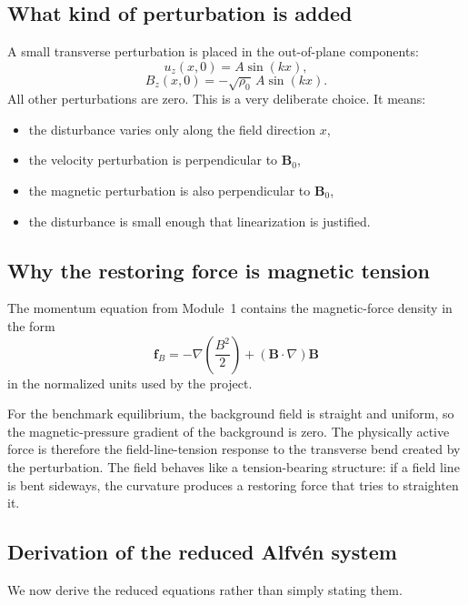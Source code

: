\documentclass[11pt]{article}
\newcommand{\Bvec}{\mathbf{B}}
\begin{document}
\subsection{What kind of perturbation is added}
A small transverse perturbation is placed in the out-of-plane components:
\begin{equation}
u_z(x,0) = A\sin(kx),
\label{eq:m2-uz-init}
\end{equation}
\begin{equation}
B_z(x,0) = -\sqrt{\rho_0}\,A\sin(kx).
\label{eq:m2-bz-init}
\end{equation}
All other perturbations are zero. This is a very deliberate choice. It means:
\begin{itemize}[leftmargin=1.8em]
    \item the disturbance varies only along the field direction $x$,
    \item the velocity perturbation is perpendicular to $\Bvec_0$,
    \item the magnetic perturbation is also perpendicular to $\Bvec_0$,
    \item the disturbance is small enough that linearization is justified.
\end{itemize}

\subsection{Why the restoring force is magnetic tension}
The momentum equation from Module~1 contains the magnetic-force density in the form
\begin{equation}
\mathbf{f}_B
=
-\nabla\left(\frac{B^2}{2}\right)
+
(\Bvec\cdot\nabla)\Bvec
\label{eq:m2-mag-force}
\end{equation}
in the normalized units used by the project.

For the benchmark equilibrium, the background field is straight and uniform, so the magnetic-pressure gradient of the background is zero. The physically active force is therefore the field-line-tension response to the transverse bend created by the perturbation. The field behaves like a tension-bearing structure: if a field line is bent sideways, the curvature produces a restoring force that tries to straighten it.

\subsection{Derivation of the reduced Alfv\'en system}
We now derive the reduced equations rather than simply stating them.
\end{document}
